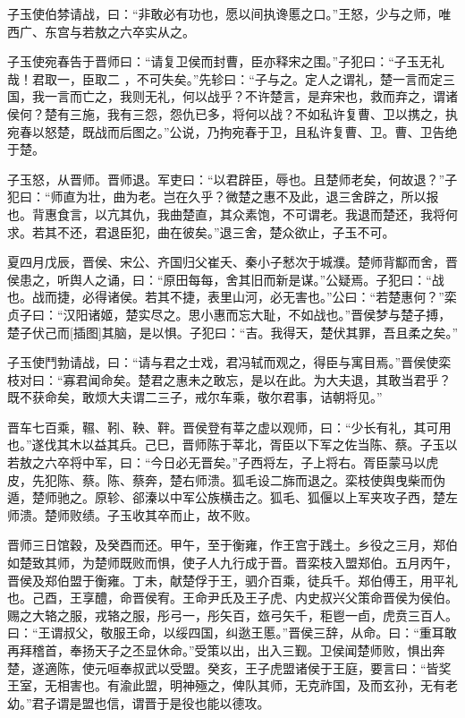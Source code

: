 \documentclass[a4paper,12pt,UTF8,twoside]{ctexbook}
\begin{document}
子玉使伯棼请战，曰：“非敢必有功也，愿以间执谗慝之口。”王怒，少与之师，唯西广、东宫与若敖之六卒实从之。

子玉使宛春告于晋师曰：“请复卫侯而封曹，臣亦释宋之围。”子犯曰：“子玉无礼哉！君取一，臣取二 ，不可失矣。”先轸曰：“子与之。定人之谓礼，楚一言而定三国，我一言而亡之，我则无礼，何以战乎？不许楚言，是弃宋也，救而弃之，谓诸侯何？楚有三施，我有三怨，怨仇已多，将何以战？不如私许复曹、卫以携之，执宛春以怒楚，既战而后图之。”公说，乃拘宛春于卫，且私许复曹、卫。曹、卫告绝于楚。

子玉怒，从晋师。晋师退。军吏曰：“以君辟臣，辱也。且楚师老矣，何故退？”子犯曰：“师直为壮，曲为老。岂在久乎？微楚之惠不及此，退三舍辟之，所以报也。背惠食言，以亢其仇，我曲楚直，其众素饱，不可谓老。我退而楚还，我将何求。若其不还，君退臣犯，曲在彼矣。”退三舍，楚众欲止，子玉不可。

夏四月戊辰，晋侯、宋公、齐国归父崔夭、秦小子慭次于城濮。楚师背酅而舍，晋侯患之，听舆人之诵，曰：“原田每每，舍其旧而新是谋。”公疑焉。子犯曰：“战也。战而捷，必得诸侯。若其不捷，表里山河，必无害也。”公曰：“若楚惠何？”栾贞子曰：“汉阳诸姬，楚实尽之。思小惠而忘大耻，不如战也。”晋侯梦与楚子搏，楚子伏己而[插图]其脑，是以惧。子犯曰：“吉。我得天，楚伏其罪，吾且柔之矣。”

子玉使鬥勃请战，曰：“请与君之士戏，君冯轼而观之，得臣与寓目焉。”晋侯使栾枝对曰：“寡君闻命矣。楚君之惠未之敢忘，是以在此。为大夫退，其敢当君乎？既不获命矣，敢烦大夫谓二三子，戒尔车乘，敬尔君事，诘朝将见。”

晋车七百乘，韅、靷、鞅、靽。晋侯登有莘之虚以观师，曰：“少长有礼，其可用也。”遂伐其木以益其兵。己巳，晋师陈于莘北，胥臣以下军之佐当陈、蔡。子玉以若敖之六卒将中军，曰：“今日必无晋矣。”子西将左，子上将右。胥臣蒙马以虎皮，先犯陈、蔡。陈、蔡奔，楚右师溃。狐毛设二旆而退之。栾枝使舆曳柴而伪遁，楚师驰之。原轸、郤溱以中军公族横击之。狐毛、狐偃以上军夹攻子西，楚左师溃。楚师败绩。子玉收其卒而止，故不败。

晋师三日馆穀，及癸酉而还。甲午，至于衡雍，作王宫于践土。乡役之三月，郑伯如楚致其师，为楚师既败而惧，使子人九行成于晋。晋栾枝入盟郑伯。五月丙午，晋侯及郑伯盟于衡雍。丁未，献楚俘于王，驷介百乘，徒兵千。郑伯傅王，用平礼也。己酉，王享醴，命晋侯宥。王命尹氏及王子虎、内史叔兴父策命晋侯为侯伯。赐之大辂之服，戎辂之服，彤弓一，彤矢百，玈弓矢千，秬鬯一卣，虎贲三百人。曰：“王谓叔父，敬服王命，以绥四国，纠逖王慝。”晋侯三辞，从命。曰：“重耳敢再拜稽首，奉扬天子之丕显休命。”受策以出，出入三觐。卫侯闻楚师败，惧出奔楚，遂適陈，使元咺奉叔武以受盟。癸亥，王子虎盟诸侯于王庭，要言曰：“皆奖王室，无相害也。有渝此盟，明神殛之，俾队其师，无克祚国，及而玄孙，无有老幼。”君子谓是盟也信，谓晋于是役也能以德攻。
\end{document}

